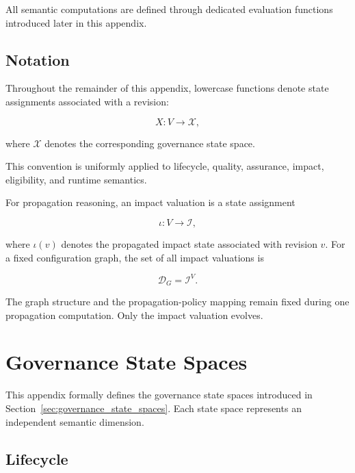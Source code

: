 \documentclass[10pt]{article}
\begin{document}
All semantic computations are defined through dedicated evaluation functions introduced later in this appendix.

\subsection{Notation}

Throughout the remainder of this appendix, lowercase functions denote state assignments associated with a revision:

\begin{equation}
	X:V\rightarrow\mathcal{X},
	\label{eq:state_assignment}
\end{equation}

where $\mathcal{X}$ denotes the corresponding governance state space.

This convention is uniformly applied to lifecycle, quality, assurance, impact, eligibility, and runtime semantics.

For propagation reasoning, an impact valuation is a state assignment

\begin{equation}
	\iota : V \rightarrow \mathcal{I},
	\label{eq:impact_valuation}
\end{equation}

where $\iota(v)$ denotes the propagated impact state associated with revision
$v$. For a fixed configuration graph, the set of all impact valuations is

\begin{equation}
	\mathcal{D}_{G}
	=
	\mathcal{I}^{V}.
	\label{eq:impact_valuation_domain}
\end{equation}

The graph structure and the propagation-policy mapping remain fixed during one
propagation computation. Only the impact valuation evolves.

\section{Governance State Spaces}
\label{appendix:state_spaces}

This appendix formally defines the governance state spaces introduced in Section~\ref{sec:governance_state_spaces}. Each state space represents an independent semantic dimension.

\subsection{Lifecycle}
\end{document}
